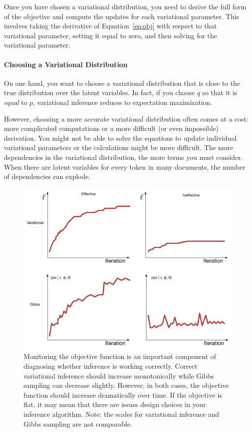 Once you have chosen a variational distribution, you need to derive
the full form of the objective and compute the updates for each
variational parameter.  This involves taking the derivative of
Equation~\ref{eq:obj} with respect to that variational parameter,
setting it equal to zero, and then solving for the variational parameter.

\paragraph{Choosing a Variational Distribution}

On one hand, you want to choose a variational distribution that is
close to the true distribution over the latent variables.  In fact, if
you choose $q$ so that it is \emph{equal} to $p$, variational
inference reduces to expectation maximization.

However, choosing a more accurate variational distribution often comes at a cost: more complicated computations or
a more difficult (or even impossible) derivation.  You might not be
able to solve the equations to update individual variational
parameters or the calculations might be more difficult. The more
dependencies in the variational distribution, the more terms you must
consider.  When there are latent variables for every token in many
documents, the number of dependencies can explode.

\begin{figure}
  \includegraphics[width=.9\linewidth]{figures/objective_functions}

  \caption{Monitoring the objective function is an important component
  of diagnosing whether inference is working correctly.  Correct
  variational inference should increase monotonically while Gibbs
  sampling can decrease slightly.  However, in both cases, the
  objective function should increase dramatically over time.  If the
  objective is flat, it may mean that there are issues design choices
  in your inference algorithm.  Note: the
  scales for variational inference and Gibbs sampling are not
  comparable.}
  \label{fig:objective_func}
\end{figure}

